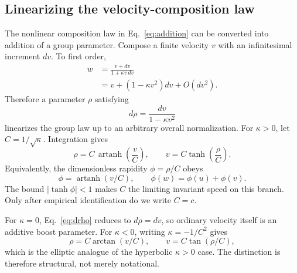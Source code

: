 \documentclass[11pt,a4paper]{article}
\newcommand{\kpar}{\kappa}
\begin{document}
\subsection{Linearizing the velocity-composition law}
The nonlinear composition law in Eq.~\eqref{eq:addition} can be converted into addition of a group parameter. Compose a finite velocity $v$ with an infinitesimal increment $dv$. To first order,
\begin{align}
w&=\frac{v+dv}{1+\kpar v\,dv}\nonumber\\
&=v+\left(1-\kpar v^2\right)dv+O(dv^2).
\end{align}
Therefore a parameter $\rho$ satisfying
\begin{equation}
d\rho=\frac{dv}{1-\kpar v^2}
\label{eq:drho}
\end{equation}
linearizes the group law up to an arbitrary overall normalization. For $\kpar>0$, let $C=1/\sqrt{\kpar}$. Integration gives
\begin{equation}
\rho=C\,\operatorname{artanh}\!\left(\frac{v}{C}\right),
\qquad
v=C\tanh\!\left(\frac{\rho}{C}\right).
\label{eq:rapidityC}
\end{equation}
Equivalently, the dimensionless rapidity $\phi=\rho/C$ obeys
\begin{equation}
\phi=\operatorname{artanh}(v/C),
\qquad
\phi(w)=\phi(u)+\phi(v).
\end{equation}
The bound $|\tanh\phi|<1$ makes $C$ the limiting invariant speed on this branch. Only after empirical identification do we write $C=c$.

For $\kpar=0$, Eq.~\eqref{eq:drho} reduces to $d\rho=dv$, so ordinary velocity itself is an additive boost parameter. For $\kpar<0$, writing $\kpar=-1/C^2$ gives
\begin{equation}
\rho=C\arctan(v/C),
\qquad
v=C\tan(\rho/C),
\end{equation}
which is the elliptic analogue of the hyperbolic $\kpar>0$ case. The distinction is therefore structural, not merely notational.
\end{document}
